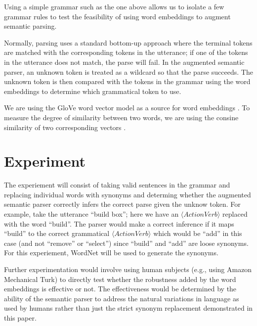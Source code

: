 \documentclass[a4paper]{article}
\begin{document}
Using a simple grammar such as the one above allows us to isolate a few grammar
rules to test the feasibility of using word embeddings to augment semantic
parsing.

Normally, parsing uses a standard bottom-up approach where the terminal tokens
are matched with the corresponding tokens in the utterance; if one of the
tokens in the utterance does not match, the parse will fail.
In the augmented semantic parser, an unknown token is treated as a wildcard
so that the parse succeeds. The unknown token is then compared with the
tokens in the grammar using the word embeddings to determine which grammatical
token to use.

We are using the GloVe word vector model as a source for word embeddings
\cite{pennington2014glove}.
To measure the degree of similarity between two words, we are using the consine
similarity of two corresponding vectors
.





\section{Experiment}

The experiement will consist of taking valid sentences in the grammar and
replacing individual words with synonyms and determing whether the augmented
semantic parser correctly infers the correct parse given the unknow token.
For example, take the utterance ``build box''; here we have an $\langle ActionVerb\rangle$
replaced with the word ``build''.
The parser would make a correct inference if it maps ``build'' to the correct
grammatical $\langle ActionVerb\rangle$ which would be ``add'' in this case (and not
``remove'' or ``select'') since ``build'' and ``add'' are loose synonyms.
For this experiement, WordNet will be used to generate the synonyms.

Further experimentation would involve using human subjects (e.g., using
Amazon Mechanical Turk) to directly test whether the robustness added by the
word embeddings is effective or not.
The effectiveness would be determined by the ability of the semantic parser
to address the natural variations in language as used by humans rather than
just the strict synonym replacement demonstrated in this paper.
\end{document}
